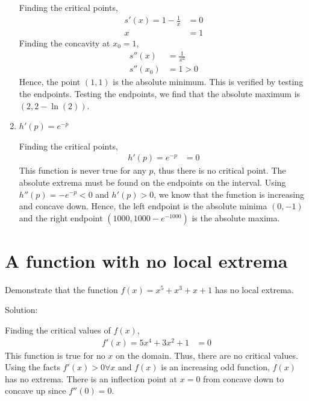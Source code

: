 \documentclass[12pt]{article}
\begin{document}
\begin{enumerate}
    Finding the critical points, 
    \begin{align*}
        s'(x) = 1- \frac{1}{x} &= 0
        \\ x&=1
    \end{align*}
    Finding the concavity at $x_0=1$,
    \begin{align*}
        s''(x) &= \frac{1}{x^2}
        \\ s''(x_0) &= 1>0
    \end{align*}
    Hence, the point $(1,1)$ is the absolute minimum. This is verified by testing the endpoints. Testing the endpoints, we find that the absolute maximum is $(2,2-\ln(2))$.
    
    \item $h'(p) = e^{-p}$
    
    Finding the critical points, 
    \begin{align*}
        h'(p) = e^{-p} &= 0
    \end{align*}
    This function is never true for any $p$, thus there is no critical point. The absolute extrema must be found on the endpoints on the interval. Using $h''(p)=-e^{-p}<0$ and $h'(p)>0$, we know that the function is increasing and concave down. Hence, the left endpoint is the absolute minima $(0,-1)$ and the right endpoint $(1000, 1000-e^{-1000})$ is the absolute maxima. 
\end{enumerate}

\section{A function with no local extrema}
Demonstrate that the function $f(x) = x^5 + x^3 +x+1$ has no local extrema.

Solution:

Finding the critical values of $f(x)$,
\begin{align*}
    f'(x) = 5x^4 + 3x^2 +1&= 0
\end{align*}
This function is true for no $x$ on the domain. Thus, there are no critical values. Using the facts $f'(x)>0 \forall x$ and $f(x)$ is an increasing odd function, $f(x)$ has no extrema. There is an inflection point at $x=0$ from concave down to concave up since $f''(0)=0$. 
\end{document}
